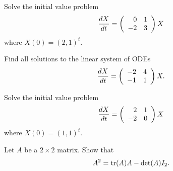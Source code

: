 \documentclass{ximera}
\begin{document}
\EXER

\TEXER

\begin{exercise} \label{c6.6.2}
Solve the initial value problem
\[
\frac{dX}{dt} = \left(\begin{array}{rr} 0 & 1\\ -2 &3\end{array}\right) X
\]
where $X(0)=(2,1)^t$.
\end{exercise}

\begin{exercise} \label{c6.6.3}
Find all solutions to the linear system of ODEs
\[
\frac{dX}{dt} = \left(\begin{array}{rr} -2 & 4\\ -1 &1\end{array}\right) X.
\]
\end{exercise}

\begin{exercise} \label{c6.6.4}
Solve the initial value problem
\[
\frac{dX}{dt} =  \left(\begin{array}{rr} 2 & 1\\ -2 &0\end{array}\right)X
\]
where $X(0)=(1,1)^t$.
\end{exercise}

\begin{exercise}  \label{c6.CH}
Let $A$ be a $2\times 2$ matrix.  Show that
\[
A^2 = {\rm tr}(A)A-\det(A)I_2.
\]
\end{exercise}
\end{document}
